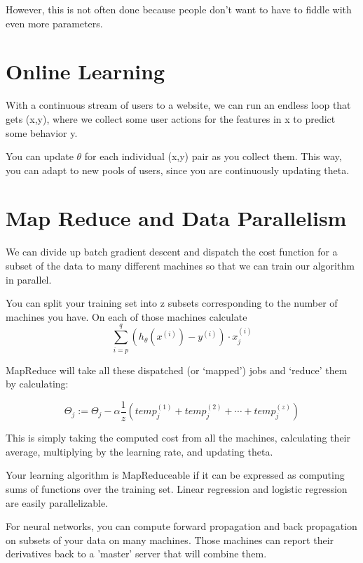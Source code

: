 However, this is not often done because people don't want to have to fiddle with even more parameters.

\section{Online Learning}
With a continuous stream of users to a website, we can run an endless loop that gets (x,y), where we collect some user actions for the features in x to predict some behavior y.

You can update $\theta$ for each individual (x,y) pair as you collect them. This way, you can adapt to new pools of users, since you are continuously updating theta.

\section{Map Reduce and Data Parallelism}
We can divide up batch gradient descent and dispatch the cost function for a subset of the data to many different machines so that we can train our algorithm in parallel.

You can split your training set into z subsets corresponding to the number of machines you have. On each of those machines calculate 
$$\sum_{i=p}^{q}(h_{\theta}(x^{(i)}) - y^{(i)}) \cdot x_j^{(i)}$$

MapReduce will take all these dispatched (or `mapped') jobs and `reduce' them by calculating:

$$
\Theta_j := \Theta_j - \alpha \dfrac{1}{z}(temp_j^{(1)} + temp_j^{(2)} + \cdots + temp_j^{(z)})
$$

This is simply taking the computed cost from all the machines, calculating their average, multiplying by the learning rate, and updating theta.

Your learning algorithm is MapReduceable if it can be expressed as computing sums of functions over the training set. Linear regression and logistic regression are easily parallelizable.

For neural networks, you can compute forward propagation and back propagation on subsets of your data on many machines. Those machines can report their derivatives back to a 'master' server that will combine them.

